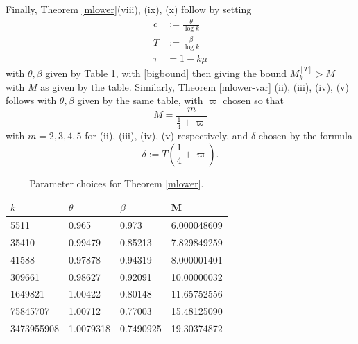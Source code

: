 Finally, Theorem \ref{mlower}(viii), (ix), (x) follow by setting
\begin{align*}
c &:= \frac{\theta}{\log k} \\
T &:= \frac{\beta}{\log k} \\
\tau &= 1 - k\mu
\end{align*}
with $\theta,\beta$ given by Table \ref{narrow-table}, with \eqref{bigbound} then giving the bound $M_k^{[T]} > M$ with $M$ as given by the table.  Similarly, Theorem \ref{mlower-var} (ii), (iii), (iv), (v) follows with $\theta,\beta$ given by the same table, with $\varpi$ chosen so that
$$ M = \frac{m}{\frac{1}{4}+\varpi} $$
with $m=2,3,4,5$ for (ii), (iii), (iv), (v) respectively, and $\delta$ chosen by the formula
$$ \delta := T (\frac{1}{4} + \varpi).$$

\begin{table}
\centering
 \caption{Parameter choices for Theorem \ref{mlower}.}
 \label{narrow-table}
  \begin{tabular}{llll}
   \toprule
     $k$    & $\theta$   & $\beta$          &M \\
   \midrule
           5511 & 0.965              & 0.973               & 6.000048609 \\ 
          35410 & 0.99479            & 0.85213             & 7.829849259 \\ [0.5ex]
          41588 & 0.97878  	         & 0.94319             & 8.000001401 \\
         309661 & 0.98627            & 0.92091             & 10.00000032 \\ [0.5ex]
				1649821 & 1.00422            & 0.80148             & 11.65752556 \\  
       75845707 & 1.00712            & 0.77003             & 15.48125090 \\  [0.5ex]
     3473955908 & 1.0079318          & 0.7490925           & 19.30374872 \\  
   \bottomrule
  \end{tabular}
\end{table}

